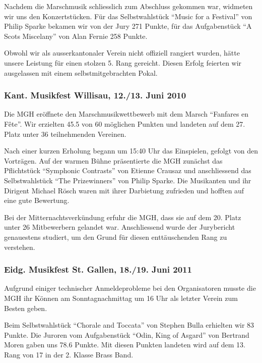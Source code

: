 \begin{history}
    Nachdem die Marschmusik schliesslich zum Abschluss gekommen war, widmeten
    wir uns den Konzertstücken. Für das Selbstwahlstück   \enquote{Music for a
        Festival} von Philip Sparke bekamen wir von der Jury 271 Punkte, für das
    Aufgabenstück \enquote{A Scots Miscelany} von Alan Fernie 258 Punkte.

    Obwohl wir als ausserkantonaler Verein nicht offiziell rangiert wurden,
    hätte unsere Leistung für einen stolzen 5. Rang gereicht. Diesen Erfolg
    feierten wir ausgelassen mit einem selbstmitgebrachten Pokal.


    \subsubsection*{Kant. Musikfest Willisau, 12./13. Juni 2010}

    Die MGH eröffnete den Marschmusikwettbewerb mit dem Marsch \enquote{Fanfares
        en Fête}. Wir erzielten 45.5 von 60 möglichen Punkten und landeten auf
    dem 27. Platz unter 36 teilnehmenden Vereinen.

    Nach einer kurzen Erholung begann um 15:40 Uhr das Einspielen, gefolgt von
    den Vorträgen. Auf der warmen Bühne präsentierte die MGH zunächst das
    Pflichtstück \enquote{Symphonic Contrasts} von Etienne Crausaz und
    anschliessend das Selbstwahlstück \enquote{The Prizewinners} von Philip
    Sparke. Die Musikanten und ihr Dirigent Michael Rösch waren mit ihrer
    Darbietung zufrieden und hofften auf eine gute Bewertung.

    Bei der Mitternachtsverkündung erfuhr die MGH, dass sie auf dem 20. Platz
    unter 26 Mitbewerbern gelandet war. Anschliessend wurde der Jurybericht
    genauestens studiert, um den Grund für diesen enttäuschenden Rang zu
    verstehen.

    \subsubsection*{Eidg. Musikfest St. Gallen, 18./19. Juni 2011}

    Aufgrund einiger technischer Anmeldeprobleme bei den Organisatoren musste
    die MGH ihr Können am Sonntagnachmittag um 16 Uhr als letzter Verein zum
    Besten geben.

    Beim Selbstwahlstück \enquote{Chorale and Toccata} von Stephen Bulla
    erhielten wir 83 Punkte. Die Juroren vom Aufgabenstück \enquote{Odin, King
        of Asgard} von Bertrand Moren gaben uns 78.6 Punkte. Mit diesen Punkten
    landeten wird auf dem 13. Rang von 17 in der 2. Klasse Brass Band.


\end{history}
